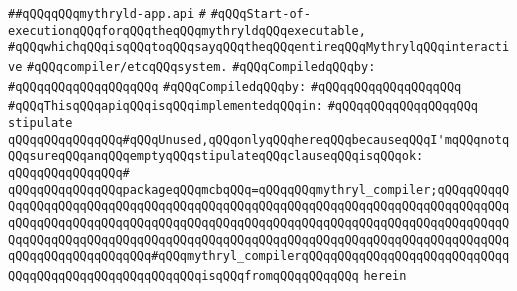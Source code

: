 \label{src/lib/core/internal/mythryld-app.api}
\verb|##qQQqqQQqmythryld-app.api|\newline
\verb|#|\newline
\verb|#qQQqStart-of-executionqQQqforqQQqtheqQQqmythryldqQQqexecutable,|\newline
\verb|#qQQqwhichqQQqisqQQqtoqQQqsayqQQqtheqQQqentireqQQqMythrylqQQqinteractive|\newline
\verb|#qQQqcompiler/etcqQQqsystem.|\newline
\newline
\verb|#qQQqCompiledqQQqby:|\newline
\verb|#qQQqqQQqqQQqqQQqqQQq|\newline
\newline
\newline
\verb|#qQQqCompiledqQQqby:|\newline
\verb|#qQQqqQQqqQQqqQQqqQQq|\newline
\newline
\verb|#qQQqThisqQQqapiqQQqisqQQqimplementedqQQqin:|\newline
\verb|#qQQqqQQqqQQqqQQqqQQq|\newline
\newline
\verb|stipulate|\newline
\verb|qQQqqQQqqQQqqQQq#qQQqUnused,qQQqonlyqQQqhereqQQqbecauseqQQqI'mqQQqnotqQQqsureqQQqanqQQqemptyqQQqstipulateqQQqclauseqQQqisqQQqok:|\newline
\verb|qQQqqQQqqQQqqQQq#|\newline
\verb|qQQqqQQqqQQqqQQqpackageqQQqmcbqQQq=qQQqqQQqmythryl_compiler;qQQqqQQqqQQqqQQqqQQqqQQqqQQqqQQqqQQqqQQqqQQqqQQqqQQqqQQqqQQqqQQqqQQqqQQqqQQqqQQqqQQqqQQqqQQqqQQqqQQqqQQqqQQqqQQqqQQqqQQqqQQqqQQqqQQqqQQqqQQqqQQqqQQqqQQqqQQqqQQqqQQqqQQqqQQqqQQqqQQqqQQqqQQqqQQqqQQqqQQqqQQqqQQqqQQqqQQqqQQqqQQqqQQqqQQqqQQqqQQq#qQQqmythryl_compilerqQQqqQQqqQQqqQQqqQQqqQQqqQQqqQQqqQQqqQQqqQQqqQQqqQQqqQQqisqQQqfromqQQqqQQqqQQq|\newline
\verb|herein|\newline
\newline
